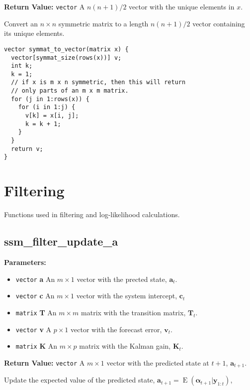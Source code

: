 \documentclass[]{book}
\providecommand{\tightlist}{%
  \setlength{\itemsep}{0pt}\setlength{\parskip}{0pt}}
\DeclareMathOperator{\E}{E}
\newcommand{\mat}[1]{\boldsymbol{#1}}
\renewcommand{\vec}[1]{\boldsymbol{#1}}
\begin{document}
\textbf{Return Value:} \texttt{vector} A \(n (n + 1) / 2\) vector with
the unique elements in \(x\).

Convert an \(n \times n\) symmetric matrix to a length \(n (n + 1) / 2\)
vector containing its unique elements.

\begin{verbatim}
vector symmat_to_vector(matrix x) {
  vector[symmat_size(rows(x))] v;
  int k;
  k = 1;
  // if x is m x n symmetric, then this will return
  // only parts of an m x m matrix.
  for (j in 1:rows(x)) {
    for (i in 1:j) {
      v[k] = x[i, j];
      k = k + 1;
    }
  }
  return v;
}
\end{verbatim}

\section{Filtering}\label{filtering-1}

Functions used in filtering and log-likelihood calculations.

\subsection{ssm\_filter\_update\_a}\label{ssmux5ffilterux5fupdateux5fa}

\textbf{Parameters:}

\begin{itemize}
\tightlist
\item
  \texttt{vector} \textbf{a} An \(m \times 1\) vector with the prected
  state, \(\vec{a}_t\).
\item
  \texttt{vector} \textbf{c} An \(m \times 1\) vector with the system
  intercept, \(\vec{c}_t\)
\item
  \texttt{matrix} \textbf{T} An \(m \times m\) matrix with the
  transition matrix, \(\mat{T}_t\).
\item
  \texttt{vector} \textbf{v} A \(p \times 1\) vector with the forecast
  error, \(\vec{v}_t\).
\item
  \texttt{matrix} \textbf{K} An \(m \times p\) matrix with the Kalman
  gain, \(\mat{K}_t\).
\end{itemize}

\textbf{Return Value:} \texttt{vector} A \(m \times 1\) vector with the
predicted state at \(t + 1\), \(\vec{a}_{t + 1}\).

Update the expected value of the predicted state,
\(\vec{a}_{t + 1} = \E(\vec{\alpha}_{t + 1} | \vec{y}_{1:t})\),
\end{document}

